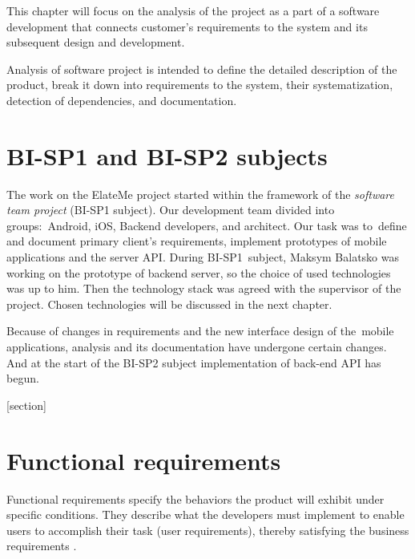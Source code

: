 This chapter will focus on the analysis of the project as a part of a software development that connects customer's
requirements to the system and its subsequent design and development.

Analysis of software project is intended to define the detailed description of the product, break it down into
requirements to the system, their systema\-tization, detection of dependencies, and documentation.


\section{BI-SP1 and BI-SP2 subjects}
The work on the ElateMe project started within the framework of the \textit{software team project} (BI-SP1 subject). Our
development team divided into groups:~Android, iOS, Backend developers, and architect. Our task was to~define and
document primary client's requirements, implement  prototypes of mobile applications and the server
\ac{API}. During BI-SP1~subject, Maksym Balatsko was working on the prototype of backend server, so the choice of used
technologies was up to him. Then the technology stack was agreed with the supervisor of the project. Chosen technologies
will be discussed in the next chapter.

Because of changes in requirements and the new interface design of the~mobile applications, analysis and its
documentation have undergone certain chan\-ges. And at the start of the BI-SP2 subject implementation of back-end
\ac{API} has begun.

[section]
\newcommand{\req}[2]{\setlength\itemsep{-0.1em}
\stepcounter{reqcounter}
\item[\textbf{#1\arabic{reqcounter}}] \textbf{#2}.}
\newcommand{\funcreq}[1]{\req{F}{#1}}
\newcommand{\nonfreq}[1]{\req{N}{#1}}

\section{Functional requirements}
Functional requirements specify the behaviors the product will exhibit under specific conditions. They describe what
the developers must implement to enable users to accomplish their task (user requirements), thereby satisfying
the business requirements \cite{funcreq}.

